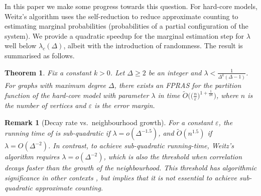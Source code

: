 \documentclass[10pt,a4paper]{article}
\newtheorem{theorem}{Theorem}[section]
\newtheorem{remark}{Remark}[section]
\newcommand{\eps}{\varepsilon}
\begin{document}
In this paper we make some progress towards this question.
For hard-core models, Weitz's algorithm uses the self-reduction \cite{JVV86} to reduce approximate counting to estimating marginal probabilities (probabilities of a partial configuration of the system).
We provide a quadratic speedup for the marginal estimation step for $\lambda$ well below $\lambda_c(\Delta)$, albeit with the introduction of randomness.
The result is summarised as follows.


\begin{theorem}
\label{small-lambda}
Fix a constant $k>0$. 
Let $\Delta\ge 2$ be an integer and $\lambda<\frac{1}{\Delta^k(\Delta-1)}$. 
For graphs with maximum degree $\Delta$, there exists an FPRAS for the partition function of the hard-core model with parameter $\lambda$ in time $\widetilde{O}\big( \big( \frac{n}{\eps} \big)^{1+\frac{1}{2k}} \big)$, 
where $n$ is the number of vertices and $\eps$ is the error margin. 
\end{theorem}


\begin{remark}[Decay rate vs.~neighbourhood growth]
For a constant $\eps$,
the running time of  is sub-quadratic if $\lambda=o(\Delta^{-1.5})$,
and $\widetilde{O}(n^{1.5})$ if $\lambda=O(\Delta^{-2})$. 
In contrast, to achieve sub-quadratic running-time, Weitz's algorithm requires $\lambda=o(\Delta^{-2})$,
which is also the threshold when correlation decays faster than the growth of the neighbourhood.
This threshold has algorithmic significance in other contexts \cite{FGY22,AJ22},
but  implies that it is not essential to achieve sub-quadratic approximate counting.
\end{remark}
\end{document}
